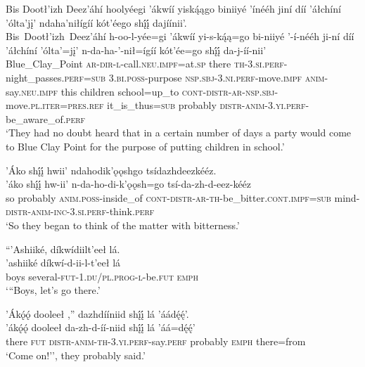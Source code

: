\ea\label{ex:text1-21-7}
Bis Dootł’izh Deez’áhí hoolyéegi ’ákwíí yiską́ągo biniiyé ’ínééh jiní díí ’áłchíní ’ólta’jį’ ndaha’niłígíí kót’éego shį́į́ dajíínii’.\\
\gll Bis~Dootł’izh~{Deez’áhí}	h-oo-l-yée=gi	’ákwíí	yi-s-ką́ą=go	bi-niiyé	’-í-nééh	ji-ní	díí	’áłchíní	’ólta’=jį’	n-da-ha-’-nił=ígíí	kót’ée=go	shį́į́	da-j-íí-nii’\\
     Blue\_Clay\_Point	\textsc{ar}-\textsc{dir}-\textsc{l}-call.\textsc{neu}.\textsc{impf}=at.\textsc{sp}	there	\textsc{th}-3.\textsc{si}.\textsc{perf}-night\_passes.\textsc{perf}=\textsc{sub}	3.\textsc{bi}.\textsc{poss}-purpose	\textsc{nsp}.\textsc{sbj}-3.\textsc{ni}.\textsc{perf}-move.\textsc{impf}	\textsc{anim}-say.\textsc{neu}.\textsc{impf}	this	children	school=up\_to	\textsc{cont}-\textsc{distr}-\textsc{ar}-\textsc{nsp}.\textsc{sbj}-move.\textsc{pl}.\textsc{iter}=\textsc{pres}.\textsc{ref}	it\_is\_thus=\textsc{sub}	probably	\textsc{distr}-\textsc{anim}-3.\textsc{yi}.\textsc{perf}-be\_aware\_of.\textsc{perf}\\
\glt `They had no doubt heard that in a certain number of days a party would come to Blue Clay Point for the purpose of putting children in school.'
\z

\ea\label{ex:text1-21-8}
’Áko shį́į́ hwii’ ndahodik’ǫǫshgo tsídazhdeezkééz.\\
\gll ’áko	shį́į́	hw-ii’	n-da-ho-di-k’ǫǫsh=go	tsí-da-zh-d-eez-kééz\\
     so	probably	\textsc{anim}.\textsc{poss}-inside\_of	\textsc{cont}-\textsc{distr}-\textsc{ar}-\textsc{th}-be\_bitter.\textsc{cont}.\textsc{impf}=\textsc{sub}	mind-\textsc{distr}-\textsc{anim}-\textsc{inc}-3.\textsc{si}.\textsc{perf}-think.\textsc{perf}\\
\glt `So they began to think of the matter with bitterness.'
\z

\ea\label{ex:text1-22-1}
``’Ashiiké, díkwídiilt’eeł lá.\\
\gll ’ashiiké	díkwí-d-ii-l-t’eeł	lá\\
     boys	several-\textsc{fut}-1.\textsc{du}/\textsc{pl}.\textsc{prog}-\textsc{l}-be.\textsc{fut}	\textsc{emph}\\
\glt `{``}Boys, let’s go there.'
\z

\newpage
\ea\label{ex:text1-22-2}
’Ákǫ́ǫ́ dooleeł ,'' dazhdííniid shį́į́ lá ’áádę́ę́’.\\
\gll ’ákǫ́ǫ́	dooleeł	da-zh-d-íí-niid	shį́į́	lá	’áá=dę́ę́’\\
     there	\textsc{fut}	\textsc{distr}-\textsc{anim}-\textsc{th}-3.\textsc{yi}.\textsc{perf}-say.\textsc{perf}	probably	\textsc{emph}	there=from\\
\glt `Come on!'', they probably said.'
\z


